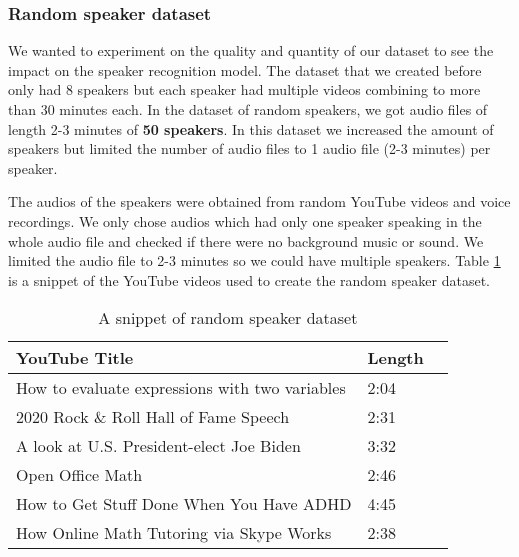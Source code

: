 \documentclass[10pt,twocolumn,letterpaper]{article}
\begin{document}
\subsubsection{Random speaker dataset}

We wanted to experiment on the quality and quantity of our dataset to see the impact on the speaker recognition model. The dataset that we created before only had 8 speakers but each speaker had multiple videos combining to more than 30 minutes each. In the dataset of random speakers, we got audio files of length 2-3 minutes of \textbf{50 speakers}. In this dataset we increased the amount of speakers but limited the number of audio files to 1 audio file (2-3 minutes) per speaker. 

The audios of the speakers were obtained from random YouTube videos and voice recordings. We only chose audios which had only one speaker speaking in the whole audio file and checked if there were no background music or sound. We limited the audio file to 2-3 minutes so we could have multiple speakers. Table \ref{tab:random-speaker-dataset} is a snippet of the YouTube videos used to create the random speaker dataset.

\begin{table}[h]
        \begin{tabular}{|l|l|l|}
        \hline
        \textbf{YouTube Title}                                       & \textbf{Length} \\ \hline
        How to evaluate expressions with two variables               & 2:04                         \\ \hline
        2020 Rock \& Roll Hall of Fame Speech                        & 2:31                         \\ \hline
        A look at U.S. President-elect Joe Biden                     & 3:32                         \\ \hline
        Open Office Math                                             & 2:46                         \\ \hline
        How to Get Stuff Done When You Have ADHD                     & 4:45                         \\ \hline
        How Online Math Tutoring via Skype Works                     & 2:38                         \\ \hline
        \end{tabular}
        \caption{A snippet of random speaker dataset}
        \label{tab:random-speaker-dataset}
\end{table}
\end{document}
